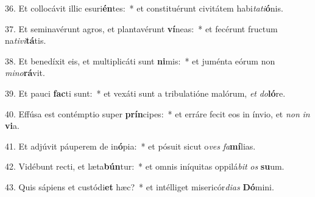 36. Et collocávit illic esuri\textbf{én}tes:~*  et constituérunt civitátem habi\textit{ta}\textit{ti}\textbf{ó}nis.\

37. Et seminavérunt agros, et plantavérunt \textbf{ví}neas:~*  et fecérunt fructum na\textit{ti}\textit{vi}\textbf{tá}tis.\

38. Et benedíxit eis, et multiplicáti sunt \textbf{ni}mis:~*  et juménta eórum non \textit{mi}\textit{no}\textbf{rá}vit.\

39. Et pauci \textbf{fac}ti sunt:~*  et vexáti sunt a tribulatióne malórum, \textit{et} \textit{do}\textbf{ló}re.\

40. Effúsa est contémptio super \textbf{prín}cipes:~*  et erráre fecit eos in ínvio, et \textit{non} \textit{in} \textbf{vi}a.\

41. Et adjúvit páuperem de in\textbf{ó}pia:~*  et pósuit sicut o\textit{ves} \textit{fa}\textbf{mí}lias.\

42. Vidébunt recti, et læta\textbf{bún}tur:~*  et omnis iníquitas oppilá\textit{bit} \textit{os} \textbf{su}um.\

43. Quis sápiens et custódi\textbf{et} hæc?~*  et intélliget misericór\textit{di}\textit{as} \textbf{Dó}mini.\

